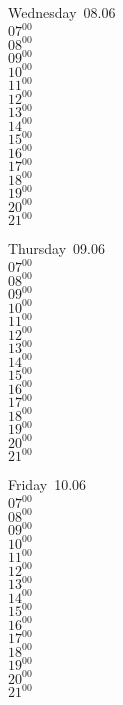 \documentclass[11pt,a4paper]{book}\usepackage[]{graphicx}\usepackage[]{color}
\begin{document}
\begin{weekdaybox}
  Wednesday~08.06\\
  { 
  \vfill
  $07^{00}$\\
$08^{00}$\\
$09^{00}$\\
$10^{00}$\\
$11^{00}$\\
$12^{00}$\\
$13^{00}$\\
$14^{00}$\\
$15^{00}$\\
$16^{00}$\\
$17^{00}$\\
$18^{00}$\\
$19^{00}$\\
$20^{00}$\\
$21^{00}$\\
  }
\end{weekdaybox}
\clearpage
\begin{headerbox}
\end{headerbox}
\begin{weekdaybox}
  Thursday~09.06\\
  { 
  \vfill
  $07^{00}$\\
$08^{00}$\\
$09^{00}$\\
$10^{00}$\\
$11^{00}$\\
$12^{00}$\\
$13^{00}$\\
$14^{00}$\\
$15^{00}$\\
$16^{00}$\\
$17^{00}$\\
$18^{00}$\\
$19^{00}$\\
$20^{00}$\\
$21^{00}$\\
  }
\end{weekdaybox} 
\begin{weekdaybox}
  Friday~10.06\\
  { 
  \vfill
  $07^{00}$\\
$08^{00}$\\
$09^{00}$\\
$10^{00}$\\
$11^{00}$\\
$12^{00}$\\
$13^{00}$\\
$14^{00}$\\
$15^{00}$\\
$16^{00}$\\
$17^{00}$\\
$18^{00}$\\
$19^{00}$\\
$20^{00}$\\
$21^{00}$\\
  }
\end{weekdaybox}
\end{document}

